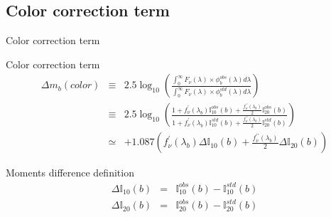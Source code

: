 \documentclass{beamer}
\begin{document}
\subsection{Color correction term}
\begin{frame}{Color correction term}
\begin{alertblock}{Color correction term}
\begin{eqnarray}
\Delta m_b (color) & \equiv  & 2.5 \log_{10} 
	\left( 
	\frac{\int_0^\infty F_\nu(\lambda) \times \phi_b^{obs}(\lambda) d\lambda }{\int_0^\infty F_\nu(\lambda) \times \phi_b^{std}(\lambda) d\lambda} 
	\right)  \nonumber \\
          & \equiv  &  2.5 \log_{10}\left( 
\frac{1 + f_\nu^\prime(\lambda_b)\mathbb{I}^{obs}_{10}(b)  +\frac{f_\nu^{\prime\prime}(\lambda_b)}{2}\mathbb{I}_{20}^{obs}(b)}
{1 + f_\nu^\prime(\lambda_b)\mathbb{I}^{std}_{10}(b)  +\frac{f_\nu^{\prime\prime}(\lambda_b)}{2}\mathbb{I}_{20}^{std}(b)}\right) \nonumber \\
& \simeq &  + 1.087\left( f_\nu^\prime(\lambda_b) \Delta \mathbb{I}_{10}(b) +
          \frac{f_\nu^{\prime\prime}(\lambda_b)}{2}\Delta \mathbb{I}_{20}(b)  \right) \nonumber
\end{eqnarray}
\end{alertblock}

\begin{block}{Moments difference definition}
\begin{eqnarray}
\Delta \mathbb{I}_{10}(b) & = &  \mathbb{I}_{10}^{obs}(b)  -  \mathbb{I}_{10}^{std}(b) \\
\Delta \mathbb{I}_{20}(b) & = &   \mathbb{I}_{20}^{obs}(b)  -  \mathbb{I}_{20}^{std}(b) 
\end{eqnarray}
\end{block}
\end{frame}
\end{document}
